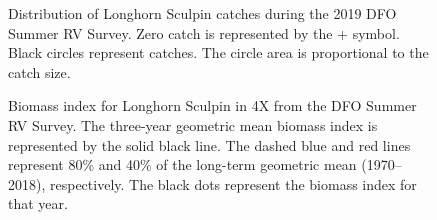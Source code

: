 \documentclass[11pt]{book}
\begin{document}
\begin{figure}[htb]

{\centering {} 

}

\caption{Distribution of Longhorn Sculpin catches during the 2019 DFO Summer RV Survey. Zero catch is represented by the + symbol. Black circles represent catches. The circle area is proportional to the catch size.}\label{fig:75-map-lsculpin}
\end{figure}

\begin{figure}[htb]

{\centering {} 

}

\caption{Biomass index for Longhorn Sculpin in 4X from the DFO Summer RV Survey. The three-year geometric mean biomass index is represented by the solid black line. The dashed blue and red lines represent 80\% and 40\% of the long-term geometric mean (1970--2018), respectively. The black dots represent the biomass index for that year.}\label{fig:76-fig-lsculpin-biomass4X}
\end{figure}
\end{document}
